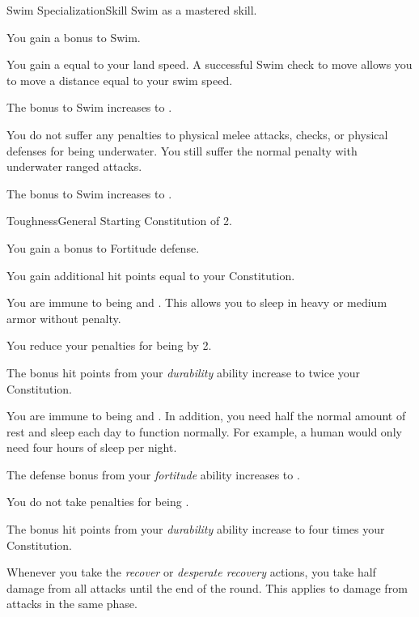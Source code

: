     \begin{feat}{Swim Specialization}{Skill}
        \featpre Swim as a mastered skill.
        \featben

         You gain a  bonus to Swim.

        \ff[2]{}

         You gain a  equal to your land speed.
        A successful Swim check to move allows you to move a distance equal to your swim speed.

         The bonus to Swim increases to .

         You do not suffer any penalties to physical melee attacks, checks, or physical defenses for being underwater.
        You still suffer the normal penalty with underwater ranged attacks.

         The bonus to Swim increases to .
    \end{feat}

    \begin{feat}{Toughness}{General}
        \featpre Starting Constitution of 2.
        \featben

         You gain a  bonus to Fortitude defense.

         You gain additional hit points equal to your Constitution.

         You are immune to being  and .
        This allows you to sleep in heavy or medium armor without penalty.

         You reduce your penalties for being  by 2.

         The bonus hit points from your \textit{durability} ability increase to twice your Constitution.

         You are immune to being  and .
        In addition, you need half the normal amount of rest and sleep each day to function normally.
        For example, a human would only need four hours of sleep per night.

         The defense bonus from your \textit{fortitude} ability increases to .

         You do not take penalties for being .

         The bonus hit points from your \textit{durability} ability increase to four times your Constitution.

         Whenever you take the \textit{recover} or \textit{desperate recovery} actions, you take half damage from all attacks until the end of the round.
        This applies to damage from attacks in the same phase.
    \end{feat}

